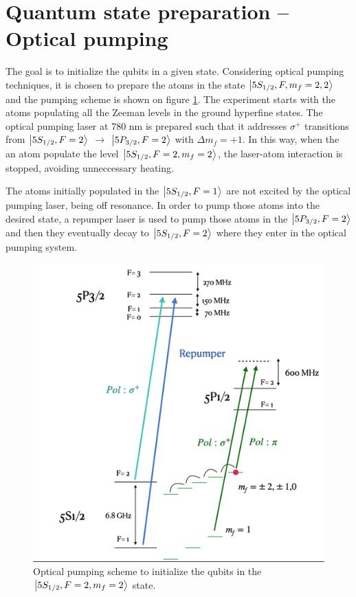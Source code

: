 \documentclass[
10pt, %
a4paper, %
oneside, %
headinclude,footinclude, %
BCOR5mm, %
]{scrartcl}
\begin{document}
\section{Quantum state preparation -- Optical pumping}

The goal is to initialize the qubits in a given state. Considering optical pumping techniques, it is chosen to prepare the atoms in the state $\ket{5S_{1/2}, F,m_{f} = 2,2}$ and the pumping scheme is shown on figure \ref{OpticalPumping}. The experiment starts with the atoms populating all the Zeeman levels in the ground hyperfine states. The optical pumping laser at 780 nm is prepared such that it addresses $\sigma^{+}$ transitions from $\ket{5S_{1/2}, F=2}$ $\rightarrow$ $\ket{5P_{3/2}, F=2}$ with $\Delta m_{f} = +1$. In this way, when the an atom populate the level $\ket{5S_{1/2}, F=2, m_{f}=2}$, the laser-atom interaction is stopped, avoiding unneccessary heating. 

The atoms initially populated in the $\ket{5S_{1/2}, F=1}$ are not excited by the optical pumping laser, being off resonance. In order to pump those atoms into the desired state, a repumper laser is used to pump those atoms in the $\ket{5P_{3/2}, F=2}$ and then they eventually decay to $\ket{5S_{1/2}, F=2}$ where they enter in the optical pumping system. 

\begin{figure}[t]
    \includegraphics[width=0.8\linewidth]{OpticalPumpingScheme}
    \centering
    \caption{Optical pumping scheme to initialize the qubits in the $\ket{5S_{1/2}, F=2, m_{f}=2}$ state.}
    \label{OpticalPumping}
\end{figure}
\end{document}
